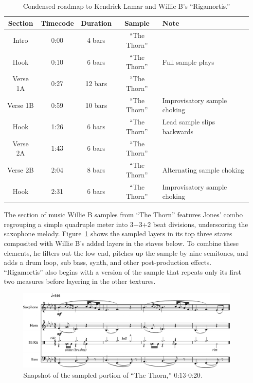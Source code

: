     \begin{table}[ht]
        \centering
            \begin{tabular}{|c|c|c|c|l|}
                \hline
                Section  & Timecode & Duration & Sample        & Note \\ \hline
                Intro    & 0:00     & 4 bars   & ``The Thorn'' & \\ \hline
                Hook     & 0:10     & 6 bars   & ``The Thorn'' & Full sample plays \\ \hline
                Verse 1A & 0:27     & 12 bars  & ``The Thorn'' & \\ \hline
                Verse 1B & 0:59     & 10 bars  & ``The Thorn'' & Improvisatory sample choking \\ \hline
                Hook     & 1:26     & 6 bars   & ``The Thorn'' & Lead sample slips backwards \\ \hline
                Verse 2A & 1:43     & 6 bars   & ``The Thorn'' & \\ \hline
                Verse 2B & 2:04     & 8 bars   & ``The Thorn'' & Alternating sample choking \\ \hline
                Hook     & 2:31     & 6 bars   & ``The Thorn'' & Improvisatory sample choking\\ \hline
            \end{tabular}
        \caption{Condensed roadmap to Kendrick Lamar and Willie B's ``Rigamortis.''}
        \label{tab:rigamortis}
    \end{table}

The section of music Willie B samples from ``The Thorn'' features Jones' combo regrouping a simple quadruple meter into 3+3+2 beat divisions, underscoring the saxophone melody. Figure~\ref{fig:2.1} shows the sampled layers in its top three staves composited with Willie B's added layers in the staves below. To combine these elements, he filters out the low end, pitches up the sample by nine semitones, and adds a drum loop, sub bass, synth, and other post-production effects. ``Rigamortis'' also begins with a version of the sample that repeats only its first two measures before layering in the other textures.

    \begin{figure}[ht]
        \centering
        \includegraphics[width=\textwidth]{images/figures/chp 02/013020thethornfull.pdf}
        \caption{Snapshot of the sampled portion of ``The Thorn,'' 0:13-0:20.}
        \label{fig:2.1}
    \end{figure}


